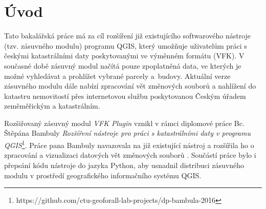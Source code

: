 \chapter{Úvod}
\label{1-uvod}
Tato bakalářská práce má za cíl rozšíření již existujícího
softwarového nástroje (tzv. zásuvného modulu) programu QGIS, který umožňuje
uživatelům práci s českými katastrálními daty poskytovanými ve výměnném
formátu (VFK). V současné době zásuvný modul načítá pouze
zpoplatněná data, ve kterých je možné vyhledávat a prohlížet vybrané
parcely a~budovy. Aktuální verze zásuvného modulu dále nabízí
zpracování vět změnových souborů a nahlížení do katastru nemovitostí
přes internetovou službu poskytovanou Českým úřadem zeměměřickým a
katastrálním.





Rozšiřovaný zásuvný modul \textit{VFK Plugin} vznikl v rámci diplomové
práce Bc. Štěpána Bambuly \textit{Rozšíření nástroje pro práci s
  katastrálními daty v programu
  QGIS}\footnote{https://github.com/ctu-geoforall-lab-projects/dp-bambula-2016}. Práce
pana Bambuly navazovala na již existující nástroj a rozšířila ho o
zpracování a vizualizaci datových vět změnových souborů
. Součástí práce bylo i přepsání kódu nástroje do jazyka
Python, aby usnadnil distribuci zásuvného modulu v prostředí
geografického informačního systému QGIS.


